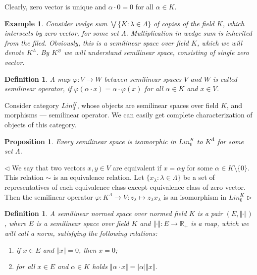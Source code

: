 \documentclass[12pt]{article}
\newtheorem{proposition}[theorem]{Proposition}
\newtheorem{definition}[theorem]{Definition}
\newtheorem{example}[theorem]{Example}
\newenvironment{proof}{\par $\triangleleft$}{$\triangleright$}
\begin{document}
Clearly, zero vector is unique and $\alpha \cdot 0 = 0$ for all $\alpha\in K$.

\begin{example}\label{ExSemiLinModelSp}
Consider wedge sum $\bigvee \{K: \lambda \in\Lambda \}$ of copies of the field 
$K$, which intersects by zero vector, for some set $\Lambda$. Multiplication in 
wedge sum is inherited from the filed. Obviously, this is a semilinear space 
over field $K$, which we will denote $K^{\Lambda}$. By $K^{\varnothing}$ we 
will understand semilinear space, consisting of single zero vector. 
\end{example}

\begin{definition}\label{DefSemiLinOp} A map $\varphi : V \to W$ between 
semilinear spaces $V$ and $W$ is called semilinear operator, if 
$\varphi(\alpha \cdot x) = \alpha \cdot \varphi(x)$ for 
all $\alpha \in K$ and $x \in V$.
\end{definition}

Consider category $Lin_{0}^{K}$, whose objects are semilinear spaces over 
field $K$, and morphisms --- semilinear operator. We can easily get complete 
characterization of objects of this category.

\begin{proposition}\label{PrSemiLinSpDesc}
Every semilinear space is isomorphic in $Lin_{0}^{K}$ to $K^{\Lambda}$ for 
some set $\Lambda$.
\end{proposition}
\begin{proof} We say that two vectors $x,y\in V$ are equivalent 
if $x=\alpha y$ for some $\alpha\in K\setminus \{0 \}$. This relation $\sim$ is 
an equivalence relation. Let $ \{x_\lambda:\lambda\in \Lambda \}$  be a set of 
representatives of each equivalence class except equivalence class of zero 
vector. Then the semilinear operator 
$\varphi: K^\Lambda\to V: z_\lambda\mapsto z_\lambda x_\lambda$ is an 
isomorphism in  $Lin_0^K$
\end{proof}

\begin{definition}\label{DefSemiLinNorSp} A semilinear normed space over normed 
field $K$ is a pair $(E, \Vert \cdot \Vert)$, where $E$ is a semilinear space 
over field $K$ and $ \Vert \cdot \Vert : E \to \mathbb{R}_+$ is a map, which 
we will call a norm, satisfying the following relations:
\begin{enumerate}[label = (\roman*)]
    \item if $x\in E$ and $\Vert x \Vert = 0$, then $x = 0$;

    \item for all $x\in E$ and $\alpha\in K$ holds 
    $\Vert \alpha \cdot x \Vert = | \alpha| \Vert x \Vert$.
\end{enumerate}
\end{definition}
\end{document}

